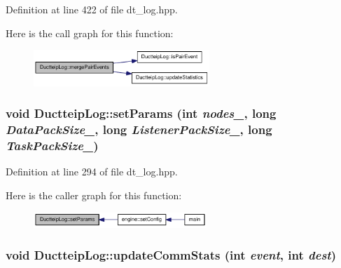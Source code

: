 Definition at line 422 of file dt\_\-log.hpp.

Here is the call graph for this function:\nopagebreak
\begin{figure}[H]
\begin{center}
\leavevmode
\includegraphics[width=188pt]{class_ductteip_log_a3062026052a3d861e37f7703808b4e29_cgraph}
\end{center}
\end{figure}
\hypertarget{class_ductteip_log_aa67193a1a86d6f269cd1313c2c96a625}{
\subsubsection[{setParams}]{\setlength{\rightskip}{0pt plus 5cm}void DuctteipLog::setParams (int {\em nodes\_\-}, \/  long {\em DataPackSize\_\-}, \/  long {\em ListenerPackSize\_\-}, \/  long {\em TaskPackSize\_\-})}}
\label{class_ductteip_log_aa67193a1a86d6f269cd1313c2c96a625}


Definition at line 294 of file dt\_\-log.hpp.

Here is the caller graph for this function:\nopagebreak
\begin{figure}[H]
\begin{center}
\leavevmode
\includegraphics[width=185pt]{class_ductteip_log_aa67193a1a86d6f269cd1313c2c96a625_icgraph}
\end{center}
\end{figure}
\hypertarget{class_ductteip_log_a3f2679d12c317c14c06ac0a23243cb6a}{
\subsubsection[{updateCommStats}]{\setlength{\rightskip}{0pt plus 5cm}void DuctteipLog::updateCommStats (int {\em event}, \/  int {\em dest})}}
\label{class_ductteip_log_a3f2679d12c317c14c06ac0a23243cb6a}


